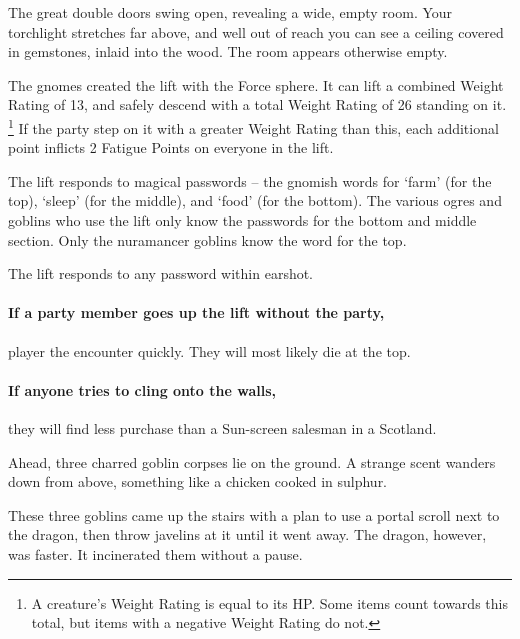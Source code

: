 \begin{multicols}{2}
\begin{boxtext}
	The great double doors swing open, revealing a wide, empty room.
	Your torchlight stretches far above, and well out of reach you can see a ceiling covered in gemstones, inlaid into the wood.
	The room appears otherwise empty.

\end{boxtext}

The gnomes created the lift with the Force sphere.
It can lift a combined Weight Rating of 13, and safely descend with a total Weight Rating of 26 standing on it.%
\footnote{A creature's Weight Rating is equal to its HP.
Some items count towards this total, but items with a negative Weight Rating do not.}
If the party step on it with a greater Weight Rating than this, each additional point inflicts 2 Fatigue Points on everyone in the lift.

The lift responds to magical passwords -- the gnomish words for `farm' (for the top), `sleep' (for the middle), and `food' (for the bottom).
The various ogres and goblins who use the lift only know the passwords for the bottom and middle section.
Only the nuramancer goblins know the word for the top.

The lift responds to any password within earshot.

\paragraph{If a party member goes up the lift without the party,}
player the encounter quickly.
They will most likely die at the top.

\paragraph{If anyone tries to cling onto the walls,}
they will find less purchase than a Sun-screen salesman in a Scotland.


\begin{boxtext}

	Ahead, three charred goblin corpses lie on the ground.
	A strange scent wanders down from above, something like a chicken cooked in sulphur.

\end{boxtext}

\begin{exampletext}

	These three goblins came up the stairs with a plan to use a portal scroll next to the dragon, then throw javelins at it until it went away.
	The dragon, however, was faster.
	It incinerated them without a pause.


\end{exampletext}
\end{multicols}
